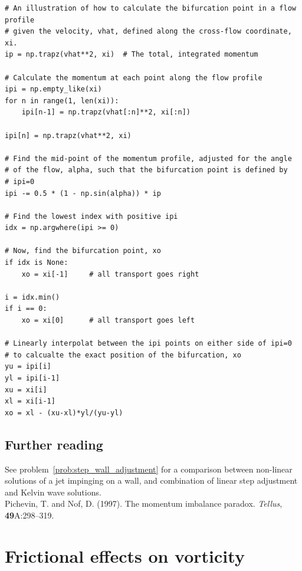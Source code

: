 \documentclass[11pt]{report}
\numberwithin{equation}{section}
\begin{document}
\begin{lstlisting}[float=tp, 
                  caption={Numerical solution to find bifurcation point in a flow profile.  See {\tt split\_jet.py} for the full code.},
                  label=lst:bifurcation]
# An illustration of how to calculate the bifurcation point in a flow profile
# given the velocity, vhat, defined along the cross-flow coordinate, xi.
ip = np.trapz(vhat**2, xi)  # The total, integrated momentum

# Calculate the momentum at each point along the flow profile
ipi = np.empty_like(xi)
for n in range(1, len(xi)):
    ipi[n-1] = np.trapz(vhat[:n]**2, xi[:n])

ipi[n] = np.trapz(vhat**2, xi)

# Find the mid-point of the momentum profile, adjusted for the angle
# of the flow, alpha, such that the bifurcation point is defined by
# ipi=0
ipi -= 0.5 * (1 - np.sin(alpha)) * ip

# Find the lowest index with positive ipi
idx = np.argwhere(ipi >= 0)

# Now, find the bifurcation point, xo
if idx is None:
    xo = xi[-1]     # all transport goes right

i = idx.min()
if i == 0: 
    xo = xi[0]      # all transport goes left

# Linearly interpolat between the ipi points on either side of ipi=0
# to calcualte the exact position of the bifurcation, xo
yu = ipi[i]
yl = ipi[i-1]
xu = xi[i]
xl = xi[i-1]
xo = xl - (xu-xl)*yl/(yu-yl)
\end{lstlisting}





\subsection*{Further reading}

See problem~\ref{prob:step_wall_adjustment} for a comparison between non-linear solutions of a jet impinging on a wall, and combination of linear step adjustment and Kelvin wave solutions.\\

\noindent
Pichevin, T. and Nof, D. (1997). The momentum imbalance paradox. \emph{Tellus}, {\bf 49}A:298--319.\nocite{pichevin.nof:97}


\section{Frictional effects on vorticity}
\end{document}
